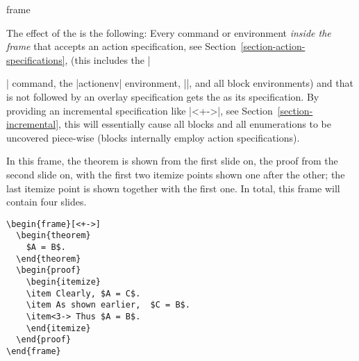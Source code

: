 \begin{environment}{{frame}%
    }
\begin{frame}[<+->][plain]
\begin{frame}[plain]
  The effect of the  is the
  following: Every command or environment \emph{inside the frame} that
  accepts an action specification, see
  Section~\ref{section-action-specifications}, (this includes the
  |\item| command, the |actionenv| environment, |\action|, and all
  block environments) and that is not followed by
  an overlay specification gets the  as its specification. By providing an incremental
  specification like |<+->|, see Section~\ref{section-incremental},
  this will essentially cause all blocks and all enumerations to be
  uncovered piece-wise (blocks internally employ action
  specifications).

  \example In this frame, the theorem is shown from the first slide
  on, the proof from the second slide on, with the first two itemize
  points shown one after the other; the last itemize point is shown
  together with the first one. In total, this frame will contain four
  slides.
\begin{verbatim}
\begin{frame}[<+->]
  \begin{theorem}
    $A = B$.
  \end{theorem}
  \begin{proof}
    \begin{itemize}
    \item Clearly, $A = C$.
    \item As shown earlier,  $C = B$.
    \item<3-> Thus $A = B$.
    \end{itemize}
  \end{proof}
\end{frame}
\end{verbatim}


\end{frame}
\end{frame}
\end{environment}
